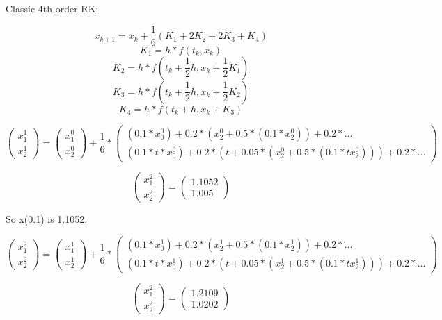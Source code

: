 \documentclass[]{article}
\begin{document}
Classic 4th order RK:

\[x_{k+1} = x_k + \frac16(K_1 + 2K_2 + 2K_3 + K_4)\]
\[K_1 = h*f(t_k, x_k)\] \[K_2 = h*f(t_k + \frac12h, x_k + \frac12K_1)\]
\[K_3 = h*f(t_k + \frac12h, x_k + \frac12K_2)\]
\[K_4 = h*f(t_k + h, x_k + K_3)\]

\[
\left(\begin{array}{c} 
x_1^1\\
x_2^1
\end{array}\right)=
\left(\begin{array}{c} 
x_1^0 \\
x_2^0 
\end{array}\right) + \frac16 *
\left(\begin{array}{c}
(0.1 * x_0^0) + 0.2 * (x_2^0 + 0.5*(0.1 * x_2^0)) + 0.2 *  ...\\
(0.1 * t*x_0^0) + 0.2 * (t + 0.05 *(x_2^0 + 0.5 * (0.1 * tx_2^0))) + 0.2 * ... 
\end{array}\right)
\]

\[
\left(\begin{array}{c} 
x_1^2\\
x_2^2
\end{array}\right)=
\left(\begin{array}{c} 
1.1052 \\
1.005
\end{array}\right)
\]

So x(0.1) is 1.1052.

\[
\left(\begin{array}{c} 
x_1^2\\
x_2^2
\end{array}\right)=
\left(\begin{array}{c} 
x_1^1 \\
x_2^1 
\end{array}\right) + \frac16 *
\left(\begin{array}{c}
(0.1 * x_0^1) + 0.2 * (x_2^1 + 0.5*(0.1 * x_2^1)) + 0.2 *  ...\\
(0.1 * t*x_0^1) + 0.2 * (t + 0.05 *(x_2^1 + 0.5 * (0.1 * tx_2^1))) + 0.2 * ... 
\end{array}\right)
\]

\[
\left(\begin{array}{c} 
x_1^2\\
x_2^2
\end{array}\right)=
\left(\begin{array}{c} 
1.2109 \\
1.0202
\end{array}\right)
\]
\end{document}
